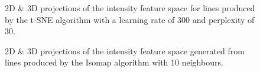 
\clearpage
\begin{figure}[H]
	\centering
	\caption{2D \& 3D projections of the intensity feature space for lines produced by the t-SNE algorithm with a learning rate of 300 and perplexity of 30.}\label{fig:intensity_SNE_mapping_lines}
\end{figure}

\begin{figure}[H]
	\centering
	\caption{2D \& 3D projections of the intensity feature space generated from lines produced by the Isomap algorithm with 10 neighbours.}\label{fig:intensity_iso_mapping_lines}
\end{figure}

